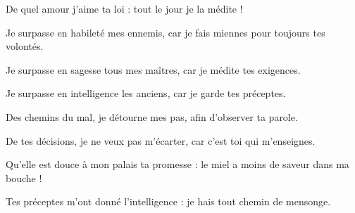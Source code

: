 \item De quel amour j'aime ta loi : tout le jour je la médite !

\item Je surpasse en habileté mes ennemis, car je fais miennes pour toujours tes volontés.

\item Je surpasse en sagesse tous mes maîtres, car je médite tes exigences.

\item Je surpasse en intelligence les anciens, car je garde tes préceptes.

\item Des chemins du mal, je détourne mes pas, afin d'observer ta parole.

\item De tes décisions, je ne veux pas m'écarter, car c'est toi qui m'enseignes.

\item Qu'elle est douce à mon palais ta promesse : le miel a moins de saveur dans ma bouche !

\item Tes préceptes m'ont donné l'intelligence : je hais tout chemin de mensonge.
